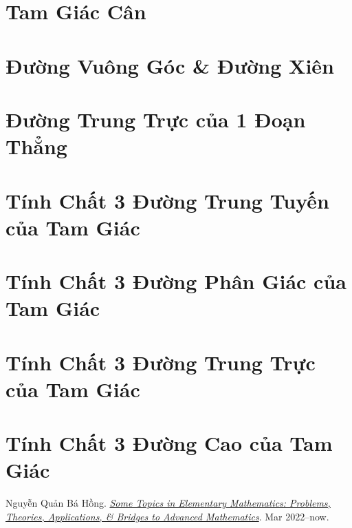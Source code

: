 \documentclass[oneside]{book}
\numberwithin{equation}{section}
\begin{document}
\section{Tam Giác Cân}

\section{Đường Vuông Góc \& Đường Xiên}

\section{Đường Trung Trực của 1 Đoạn Thẳng}

\section{Tính Chất 3 Đường Trung Tuyến của Tam Giác}

\section{Tính Chất 3 Đường Phân Giác của Tam Giác}

\section{Tính Chất 3 Đường Trung Trực của Tam Giác}

\section{Tính Chất 3 Đường Cao của Tam Giác}


\begin{thebibliography}{99}
	 Nguyễn Quản Bá Hồng. \href{https://github.com/NQBH/hobby/blob/master/elementary_mathematics/some_topics_in_elementary_mathematics_problems_theories_applications_bridges_to_advanced_mathematics/NQBH_some_topics_in_elementary_mathematics_problems_theories_applications_bridges_to_advanced_mathematics.pdf}{\textit{Some Topics in Elementary Mathematics: Problems, Theories, Applications, \& Bridges to Advanced Mathematics}}. Mar 2022--now.
\end{thebibliography}


\printbibliography[heading=bibintoc]
	
\end{document}
